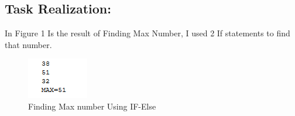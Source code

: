 \documentclass[12pt]{article}
\begin{document}
                


        \subsection*{Task Realization:}
        In Figure 1 Is the result of Finding Max Number, I used 2 If statements to find that number.
        \begin{figure}[H]
                \centering
                \includegraphics[width=.3\textwidth]{img1.png}
                \caption{Finding Max number Using IF-Else}
        \end{figure}
        \vspace{0.5 cm}
        
\end{document}
